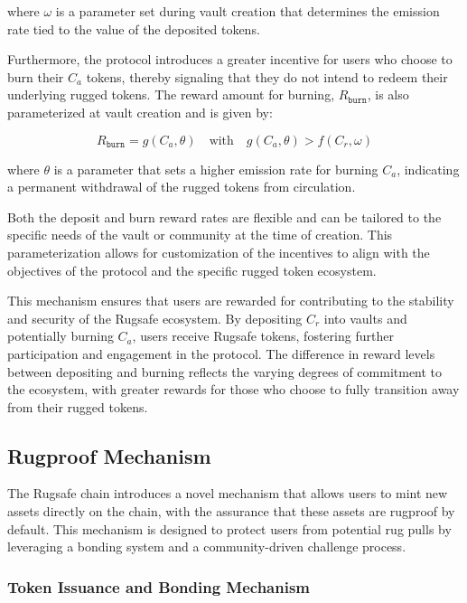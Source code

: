 \documentclass{article}
\begin{document}
where $\omega$ is a parameter set during vault creation that determines the emission rate tied to the value of the deposited tokens.

Furthermore, the protocol introduces a greater incentive for users who choose to burn their $C_a$ tokens, thereby signaling that they do not intend to redeem their underlying rugged tokens. The reward amount for burning, $R_{\texttt{burn}}$, is also parameterized at vault creation and is given by:

\[
R_{\texttt{burn}} = g(C_a, \theta) \quad \text{with} \quad g(C_a, \theta) > f(C_r, \omega)
\]

where $\theta$ is a parameter that sets a higher emission rate for burning $C_a$, indicating a permanent withdrawal of the rugged tokens from circulation.

Both the deposit and burn reward rates are flexible and can be tailored to the specific needs of the vault or community at the time of creation. This parameterization allows for customization of the incentives to align with the objectives of the protocol and the specific rugged token ecosystem.

This mechanism ensures that users are rewarded for contributing to the stability and security of the Rugsafe ecosystem. By depositing $C_r$ into vaults and potentially burning $C_a$, users receive Rugsafe tokens, fostering further participation and engagement in the protocol. The difference in reward levels between depositing and burning reflects the varying degrees of commitment to the ecosystem, with greater rewards for those who choose to fully transition away from their rugged tokens.













\subsection{Rugproof Mechanism}

The Rugsafe chain introduces a novel mechanism that allows users to mint new assets directly on the chain, with the assurance that these assets are rugproof by default. This mechanism is designed to protect users from potential rug pulls by leveraging a bonding system and a community-driven challenge process.

\subsubsection{Token Issuance and Bonding Mechanism}
\end{document}
